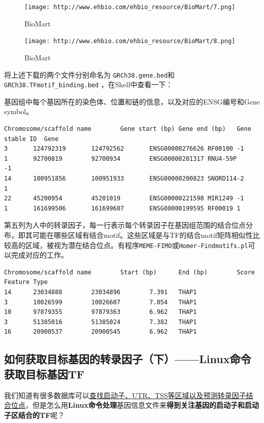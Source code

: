 \documentclass[]{article}
\numberwithin{figure}{section}
\numberwithin{table}{section}
\begin{document}
\begin{enumerate}
  \begin{figure}
  \centering
  \texttt{[image: http://www.ehbio.com/ehbio\_resource/BioMart/7.png]}
  \caption{BioMart}
  \end{figure}

  \begin{figure}
  \centering
  \texttt{[image: http://www.ehbio.com/ehbio\_resource/BioMart/8.png]}
  \caption{BioMart}
  \end{figure}
\end{enumerate}

将上述下载的两个文件分别命名为 \texttt{GRCh38.gene.bed}和 \texttt{GRCh38.TFmotif\_binding.bed} ，在Shell中查看一下：

基因组中每个基因所在的染色体、位置和链的信息，以及对应的ENSG编号和Gene symbol。

\begin{verbatim}
Chromosome/scaffold name        Gene start (bp) Gene end (bp)   Gene stable ID  Gene
3       124792319       124792562       ENSG00000276626 RF00100 -1
1       92700819        92700934        ENSG00000201317 RNU4-59P        -1
14      100951856       100951933       ENSG00000200823 SNORD114-2      1
22      45200954        45201019        ENSG00000221598 MIR1249 -1
1       161699506       161699607       ENSG00000199595 RF00019 1
\end{verbatim}

第五列为人中的转录因子，每一行表示每个转录因子在基因组范围的结合位点分布，即其可能在哪些区域有结合motif。这些区域是与TF的结合motif矩阵相似性比较高的区域，被视为潜在结合位点。有程序\texttt{MEME-FIMO}或\texttt{Homer-Findmotifs.pl}可以完成对应的工作。

\begin{verbatim}
Chromosome/scaffold name        Start (bp)      End (bp)        Score   Feature Type
14      23034888        23034896        7.391   THAP1
3       10026599        10026607        7.054   THAP1
10      97879355        97879363        6.962   THAP1
3       51385016        51385024        7.382   THAP1
16      20900537        20900545        6.962   THAP1
\end{verbatim}

\hypertarget{biomart_motif_4}{%
\subsection{如何获取目标基因的转录因子（下）------Linux命令获取目标基因TF}\label{biomart_motif_4}}

我们知道有很多数据库可以\href{https://mp.weixin.qq.com/s/vFO7uAtI6nh-zTW7RHCixA}{查找启动子、UTR、TSS等区域以及预测转录因子结合位点}，但是怎么用\textbf{Linux命令处理}基因信息文件来\textbf{得到关注基因的启动子和启动子区结合的TF}呢？
\end{document}
